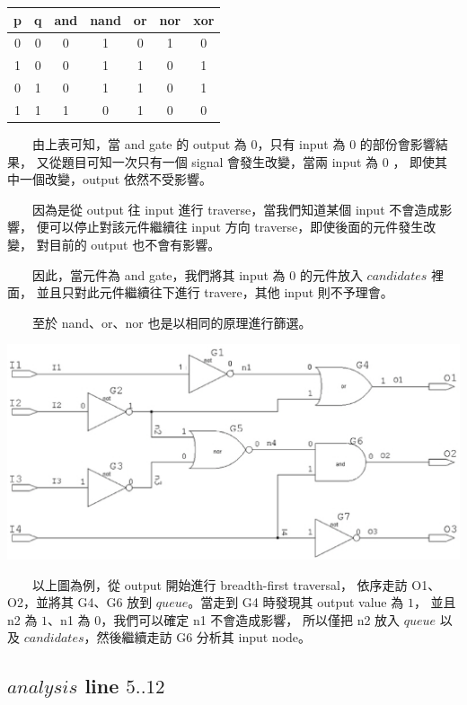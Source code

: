 \documentclass[12pt,a4paper]{article}
\begin{document}
\begin{CJK*}{UTF8}{song}
\begin{center}
\begin{tabular}{|c|c|c|c|c|c|c|}
\hline
p & q & and & nand & or & nor & xor\\
\hline
0 & 0 & 0   & 1    & 0  & 1   & 0\\
\hline
1 & 0 & 0   & 1    & 1  & 0   & 1\\
\hline
0 & 1 & 0   & 1    & 1  & 0   & 1\\
\hline
1 & 1 & 1   & 0    & 1  & 0   & 0\\
\hline
\end{tabular}
\end{center}

　　由上表可知，當 and gate 的 output 為 $0$，只有 input 為 $0$ 的部份會影響結果，%
又從題目可知一次只有一個 signal 會發生改變，當兩 input 為 $0$ ，%
即使其中一個改變，output 依然不受影響。

　　因為是從 output 往 input 進行 traverse，當我們知道某個 input 不會造成影響，%
便可以停止對該元件繼續往 input 方向 traverse，即使後面的元件發生改變，%
對目前的 output 也不會有影響。

　　因此，當元件為 and gate，我們將其 input 為 $0$ 的元件放入 $candidates$ 裡面，%
並且只對此元件繼續往下進行 travere，其他 input 則不予理會。

　　至於 nand、or、nor 也是以相同的原理進行篩選。

\begin{center}
\includegraphics[scale=0.6]{imgs/04.eps}
\end{center}

　　以上圖為例，從 output 開始進行 breadth-first traversal，%
依序走訪 O1、O2，並將其 G4、G6 放到 $queue$。當走到 G4 時發現其 output value 為 $1$，%
並且 n2 為 $1$、n1 為 $0$，我們可以確定 n1 不會造成影響，%
所以僅把 n2 放入 $queue$ 以及 $candidates$，然後繼續走訪 G6 分析其 input node。

\subsection{$analysis$ line $5..12$}


\end{CJK*}
\end{document}
